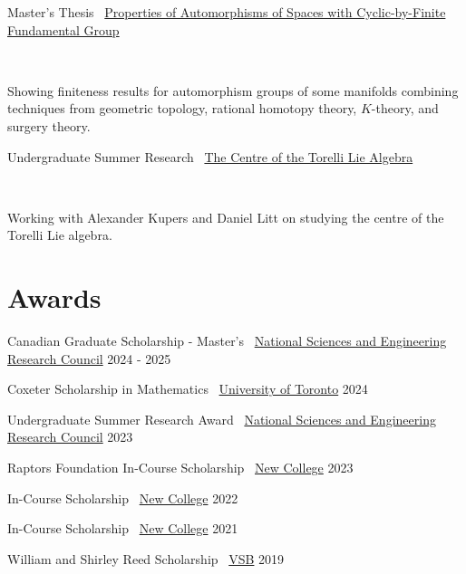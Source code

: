 \documentclass[]{style}
\begin{document}
\begin{entrylist}

\vspace{1mm}

\entry
{Master's Thesis \ {\normalfont \underline{Properties of Automorphisms of Spaces with Cyclic-by-Finite Fundamental Group}}}
{}
{ ~ \vspace{-2.5mm}

Showing finiteness results for automorphism groups of some manifolds combining techniques from geometric topology, rational homotopy theory, $K$-theory, and surgery theory.}

\entry
{Undergraduate Summer Research \ {\normalfont \underline{The Centre of the Torelli Lie Algebra}}}
{}
{ ~ \vspace{-2.5mm}

Working with Alexander Kupers and Daniel Litt on studying the centre of the Torelli Lie algebra.}

\end{entrylist}

\section{Awards}

\begin{entrylist}

\vspace{-3mm}
\entry
{Canadian Graduate Scholarship - Master's \ {\normalfont \underline{National Sciences and Engineering Research Council}}}
{2024 - 2025}
{}

\vspace{-3mm}
\entry
{Coxeter Scholarship in Mathematics \ {\normalfont \underline{University of Toronto}}}
{2024}
{}

\vspace{-3mm}
\entry
{Undergraduate Summer Research Award \ {\normalfont \underline{National Sciences and Engineering Research Council}}}
{2023}
{}

\vspace{-3mm}
\entry
{Raptors Foundation In-Course Scholarship \ {\normalfont \underline{New College}}}
{2023}
{}

\vspace{-3mm}
\entry
{In-Course Scholarship \ {\normalfont \underline{New College}}}
{2022}
{}

\vspace{-3mm}
\entry
{In-Course Scholarship \ {\normalfont \underline{New College}}}
{2021}
{}

\vspace{-3mm}
\entry
{William and Shirley Reed Scholarship \ {\normalfont \underline{VSB}}}
{2019}
{}

\end{entrylist}
\end{document}

